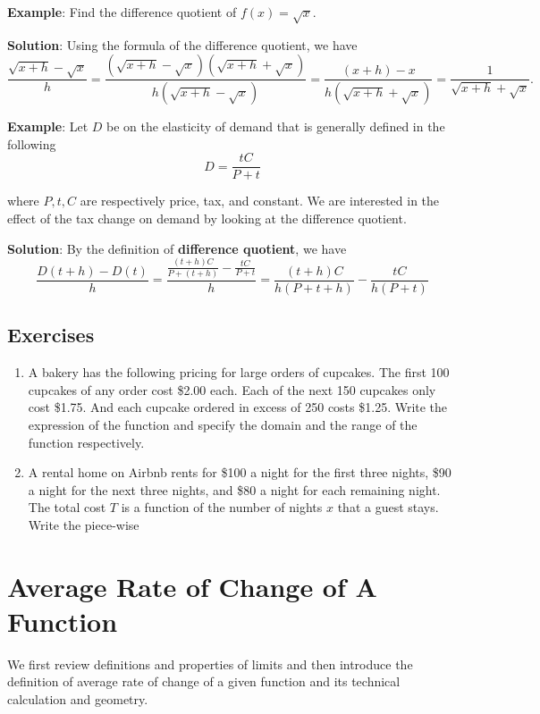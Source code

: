 \documentclass[
]{book}
\begin{document}
\textbf{Example}: Find the difference quotient of \(f(x) = \sqrt{x}\).

\textbf{Solution}: Using the formula of the difference quotient, we have
\[
\frac{\sqrt{x+h}-\sqrt{x}}{h} = \frac{(\sqrt{x+h}-\sqrt{x})(\sqrt{x+h}+\sqrt{x})}{h(\sqrt{x+h}-\sqrt{x})} = \frac{(x+h)-x}{{h(\sqrt{x+h}+\sqrt{x})}} = \frac{1}{\sqrt{x+h}+\sqrt{x}}.
\]

\textbf{Example}: Let \(D\) be on the elasticity of demand that is generally defined in the following
\[
D = \frac{tC}{P + t}
\]

where \(P,t, C\) are respectively price, tax, and constant. We are interested in the effect of the tax change on demand by looking at the difference quotient.

\textbf{Solution}: By the definition of \textbf{difference quotient}, we have
\[
\frac{D(t+h) - D(t)}{h} = \frac{\frac{(t+h)C}{P+(t+h)}-\frac{tC}{P+t}}{h} = \frac{(t+h)C}{h(P+t+h)}-\frac{tC}{h(P+t)}
\]

\hypertarget{exercises}{%
\section{Exercises}\label{exercises}}

\begin{enumerate}
\def\labelenumi{\arabic{enumi}.}
\item
  A bakery has the following pricing for large orders of cupcakes. The first 100 cupcakes of any order cost \$2.00 each. Each of the next 150 cupcakes only cost \$1.75. And each cupcake ordered in excess of 250 costs \$1.25. Write the expression of the function and specify the domain and the range of the function respectively.
\item
  A rental home on Airbnb rents for \$100 a night for the first three nights, \$90 a night for the next three nights, and \$80 a night for each remaining night. The total cost \(T\) is a function of the number of nights \(x\) that a guest stays. Write the piece-wise
\end{enumerate}

\hypertarget{average-rate-of-change-of-a-function}{%
\chapter{Average Rate of Change of A Function}\label{average-rate-of-change-of-a-function}}

We first review definitions and properties of limits and then introduce the definition of average rate of change of a given function and its technical calculation and geometry.
\end{document}
